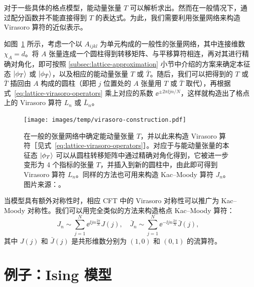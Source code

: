 对于一些具体的格点模型\cite{koo1994representations,milsted2017extraction}，能动量张量 $T$ 可以解析求出。然而在一般情况下，通过配分函数并不能直接得到 $T$ 的表达式。为此，我们需要利用张量网络来构造 Virasoro 算符的近似表示。

如图~\ref{fig:virasoro-construction} 所示，考虑一个以 $A_{ijkl}$ 为单元构成的一般性的张量网络，其中连接维数 $\chi_A=d$。将 $A$ 张量连成一个圆柱得到转移矩阵、与平移算符相连，再对其进行精确对角化，即可按照 \ref{subsec:lattice-approximation} 小节中介绍的方案来确定本征态 $\ket*{\phi_T}$ 或 $\ket*{\phi_{\bar{T}}}$，以及相应的能动量张量 $T$ 或 $\bar{T}$。随后，我们可以把得到的 $T$ 或 $\bar{T}$ 插回由 $A$ 构成的圆柱（即把 $j$ 位置处的 $A$ 张量用 $T$ 或 $\bar{T}$ 取代），再根据式~\eqref{eq:lattice-virasoro-operators} 乘上对应的系数 $\ee^{\pm2\pi\ii j n/N}$，这样就构造出了格点上的 Virasoro 算符 $L_n$ 或 $\bar{L}_n$。

\begin{figure}[ht]
  \centering
  \texttt{[image: images/temp/virasoro-construction.pdf]}
  \caption[能动量张量与 Virasoro 算符的构造]{在一般的张量网络中确定能动量张量 $T$，并以此来构造 Virasoro 算符［见式~\eqref{eq:lattice-virasoro-operators}］。对应于与能动量张量的本征态 $\ket*{\phi_T}$ 可以从圆柱转移矩阵中通过精确对角化得到，它被进一步变形为 4 个指标的张量 $T$，并插入到新的圆柱中，由此即可得到 Virasoro 算符 $L_n$。同样的方法也可用来构造 Kac--Moody 算符 $J_n$。图片来源：\parencite{wang2022virasoro}。}
  \label{fig:virasoro-construction}
\end{figure}

当模型具有额外对称性时，相应 CFT 中的 Virasoro 对称性可以推广为 Kac--Moody 对称性。我们可以用完全类似的方法来构造格点 Kac--Moody 算符：
\begin{equation}
  J_n       \sim \sum_{j=1}^N \ee^{ \ii j n \frac{2\pi}{N}} J(j), \quad
  \bar{J}_n \sim \sum_{j=1}^N \ee^{-\ii j n \frac{2\pi}{N}} \bar{J}(j),
\end{equation}
其中 $J(j)$ 和 $\bar{J}(j)$ 是共形维数分别为 $(1,0)$ 和 $(0,1)$ 的流算符。

\section{例子：Ising 模型}

